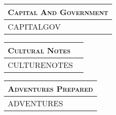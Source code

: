 \documentclass[12pt,letterpaper,twocolumn]{article}
\begin{document}
\begin{tabularx}{\linewidth}{| X |}
    \multicolumn{1}{l}{\textsc{Capital And Government}} \\
    \hline
    CAPITALGOV \ \newline \newline \newline \newline \newline \newline \newline \newline \newline \newline         \\
    \hline
\end{tabularx}

\begin{tabularx}{\linewidth}{| X |}
    \multicolumn{1}{l}{\textsc{Cultural Notes}} \\
    \hline
    CULTURENOTES \ \newline \newline \newline \newline \newline \newline \newline \newline \newline  \newline \newline \newline \newline \newline \newline\\
    \hline
\end{tabularx}

\begin{tabularx}{\linewidth}{| X |}
    \multicolumn{1}{l}{\textsc{Adventures Prepared}} \\
    \hline
    ADVENTURES \ \newline \newline \newline \newline \newline  \newline \newline \newline \newline \newline         \\
    \hline
\end{tabularx}
\end{document}
